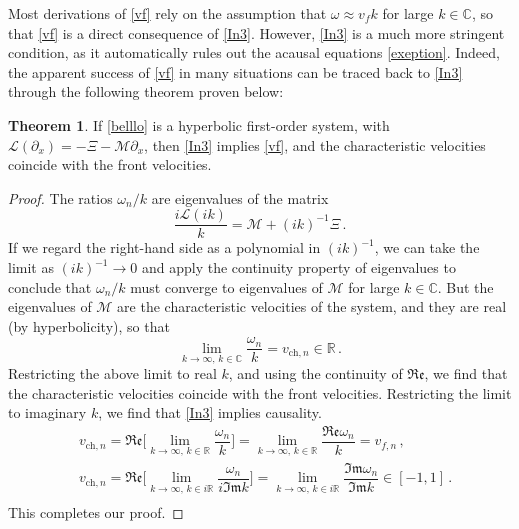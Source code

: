 \documentclass[prl, amsfonts, amssymb, amsmath, nofootinbib,reprint, showkeys, twoside,notitlepage]{revtex4-2}
\theoremstyle{definition}
\theoremstyle{theorem}
\newtheorem{theorem}{Theorem}
\theoremstyle{corollary}
\begin{document}
Most derivations of \eqref{vf} rely on the assumption that $\omega \approx v_f k$ for large $k \in \mathbb{C}$, so that \eqref{vf} is a direct consequence of \eqref{In3}. However, \eqref{In3} is a much more stringent condition, as it automatically rules out the acausal equations \eqref{exeption}. Indeed, the apparent success of \eqref{vf} in many situations can  be traced back to \eqref{In3} through the following theorem proven below:
\begin{theorem}\label{theo2}
If \eqref{belllo} is a hyperbolic first-order system, with $\mathcal{L}(\partial_x)=-\Xi-\mathcal{M}\partial_x$, then \eqref{In3} implies \eqref{vf}, and the characteristic velocities coincide with the front velocities.
\end{theorem}
\begin{proof}
The ratios $\omega_n/k$ are eigenvalues of the matrix
\begin{equation}
\dfrac{i\mathcal{L}(ik)}{k} = \mathcal{M} + (ik)^{-1} \Xi \, .
\end{equation}
If we regard the right-hand side as a polynomial in $(ik)^{-1}$, we can take the limit as $(ik)^{-1}\rightarrow 0$ and apply the continuity property of eigenvalues %
\cite{Kato_book} to conclude that $\omega_n/k$ must converge to eigenvalues of $\mathcal{M}$ for large $k \in \mathbb{C}$. But the eigenvalues of $\mathcal{M}$ are the characteristic velocities of the system, and they are real (by hyperbolicity), so that
\begin{equation}
\lim_{k \rightarrow \infty, \, k \in \mathbb{C} } \dfrac{\omega_n}{k} = v_{\text{ch},n}\in \mathbb{R} \, .
\end{equation}
Restricting the above limit to real $k$, and using the continuity of $\mathfrak{Re}$, we find that the characteristic velocities coincide with the front velocities. Restricting the limit to imaginary $k$, we find that \eqref{In3} implies causality. 
\begin{equation}
\begin{split}
& v_{\text{ch},n} = \mathfrak{Re} \bigg[ \lim_{k \rightarrow \infty, \, k \in \mathbb{R} } \dfrac{\omega_n}{k} \bigg] = \! \! \lim_{k \rightarrow \infty, \, k \in \mathbb{R} } \dfrac{\mathfrak{Re}\omega_n}{k} =v_{f,n} \, , \\
&  v_{\text{ch},n} = \mathfrak{Re} \bigg[ \lim_{k \rightarrow \infty, \, k \in i\mathbb{R} } \dfrac{\omega_n}{i \mathfrak{Im}k} \bigg] = \! \! \lim_{k \rightarrow \infty, \, k \in i\mathbb{R} } \dfrac{\mathfrak{Im}\omega_n}{\mathfrak{Im}k} {\in} [-1,1] \, . \\
  \end{split}
\end{equation} 
This completes our proof.
\end{proof}
\end{document}
